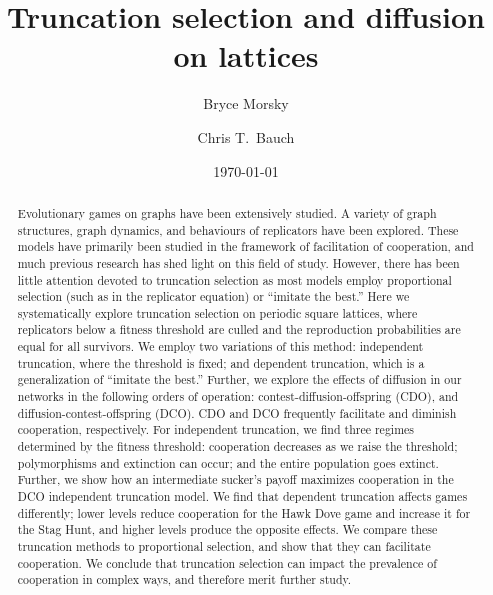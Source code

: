 \documentclass[reprint,aps,pre,twocolumn]{revtex4-1}
\begin{document}

\title{Truncation selection and diffusion on lattices}

\author{Bryce Morsky}

\author{Chris T.\ Bauch}

\date{\today}%

\begin{abstract}
Evolutionary games on graphs have been extensively studied. A variety of graph structures, graph dynamics, and behaviours of replicators have been explored. These models have primarily been studied in the framework of facilitation of cooperation, and much previous research has shed light on this field of study. However, there has been little attention devoted to truncation selection as most models employ proportional selection (such as in the replicator equation) or ``imitate the best.'' Here we systematically explore truncation selection on periodic square lattices, where replicators below a fitness threshold are culled and the reproduction probabilities are equal for all survivors. We employ two variations of this method: independent truncation, where the threshold is fixed; and dependent truncation, which is a generalization of ``imitate the best.'' Further, we explore the effects of diffusion in our networks in the following orders of operation: contest-diffusion-offspring (CDO), and diffusion-contest-offspring (DCO). CDO and DCO frequently facilitate and diminish cooperation, respectively. For independent truncation, we find three regimes determined by the fitness threshold: cooperation decreases as we raise the threshold; polymorphisms and extinction can occur; and the entire population goes extinct. Further, we show how an intermediate sucker's payoff maximizes cooperation in the DCO independent truncation model. We find that dependent truncation affects games differently; lower levels reduce cooperation for the Hawk Dove game and increase it for the Stag Hunt, and higher levels produce the opposite effects. We compare these truncation methods to proportional selection, and show that they can facilitate cooperation. We conclude that truncation selection can impact the prevalence of cooperation in complex ways, and therefore merit further study.
\end{abstract}
\end{document}
